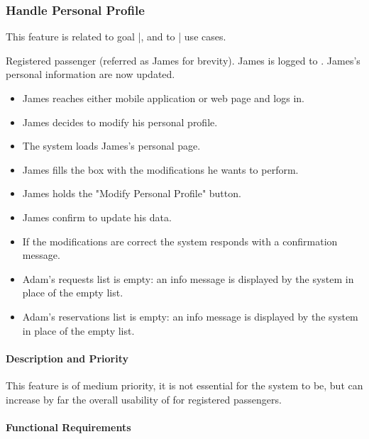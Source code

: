\subsubsection{Handle Personal Profile}
This feature is related to goal |, and to | use cases.
\begin{itemize}
	 Registered passenger (referred as James for brevity).
	 James is logged to \myTaxiService{}.
	 James's personal information are now updated.
	\begin{itemize}
		\item James reaches either \myTaxiService{} mobile application or web page and logs in.
		\item James decides to modify his personal profile.
		\item The system loads James's personal page.
		\item James fills the box with the modifications he wants to perform.
		\item James holds the "Modify Personal Profile" button.
		\item James confirm to update his data.
		\item If the modifications are correct the system responds with a confirmation message.
	\end{itemize}
	\begin{itemize}
		\item Adam's requests list is empty: an info message is displayed by the system in place of the empty list.
		\item Adam's reservations list is empty: an info message is displayed by the system in place of the empty list.
	\end{itemize}
\end{itemize}
\paragraph{Description and Priority}
This feature is of medium priority, it is not essential for the system to be, but can increase by far the overall usability of \myTaxiService{} for registered passengers.\par
\paragraph{Functional Requirements}
\begin{itemize}
\end{itemize}
